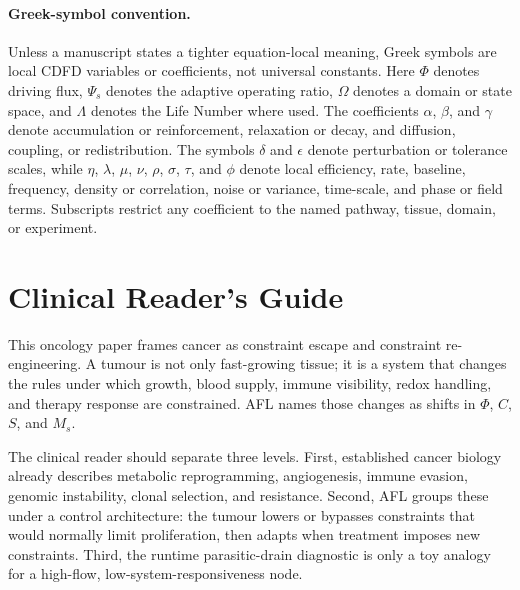 \documentclass[12pt,a4paper]{article}
\begin{document}
\begin{abstract}
\textbf{Status: Inferred}

\medskip
\noindent Within the extended framework of this series, biological networks are modeled as \emph{Adaptive Surfaces} that dynamically integrate physiological load and retain structural memory. The system's health is governed by the adaptive ratio $\Psi_s = (\Phi/C) \cdot S \cdot M_s$, where homeostasis ($\Psi_s \approx 1.0$) is maintained near the stable attractor ($S \cdot M_s \approx 1.0$), and disease emerges as surface dysregulation when maladaptive memory locks tissues into chronic constraint.

\end{abstract}


\paragraph{Greek-symbol convention.}
Unless a manuscript states a tighter equation-local meaning, Greek symbols are local CDFD variables or coefficients, not universal constants. Here $\Phi$ denotes driving flux, $\Psi_s$ denotes the adaptive operating ratio, $\Omega$ denotes a domain or state space, and $\Lambda$ denotes the Life Number where used. The coefficients $\alpha$, $\beta$, and $\gamma$ denote accumulation or reinforcement, relaxation or decay, and diffusion, coupling, or redistribution. The symbols $\delta$ and $\epsilon$ denote perturbation or tolerance scales, while $\eta$, $\lambda$, $\mu$, $\nu$, $\rho$, $\sigma$, $\tau$, and $\phi$ denote local efficiency, rate, baseline, frequency, density or correlation, noise or variance, time-scale, and phase or field terms. Subscripts restrict any coefficient to the named pathway, tissue, domain, or experiment.

\section*{Clinical Reader's Guide}
This oncology paper frames cancer as constraint escape and constraint re-engineering. A tumour is not only fast-growing tissue; it is a system that changes the rules under which growth, blood supply, immune visibility, redox handling, and therapy response are constrained. AFL names those changes as shifts in $\Phi$, $C$, $S$, and $M_s$.

The clinical reader should separate three levels. First, established cancer biology already describes metabolic reprogramming, angiogenesis, immune evasion, genomic instability, clonal selection, and resistance. Second, AFL groups these under a control architecture: the tumour lowers or bypasses constraints that would normally limit proliferation, then adapts when treatment imposes new constraints. Third, the runtime parasitic-drain diagnostic is only a toy analogy for a high-flow, low-system-responsiveness node.
\end{document}
